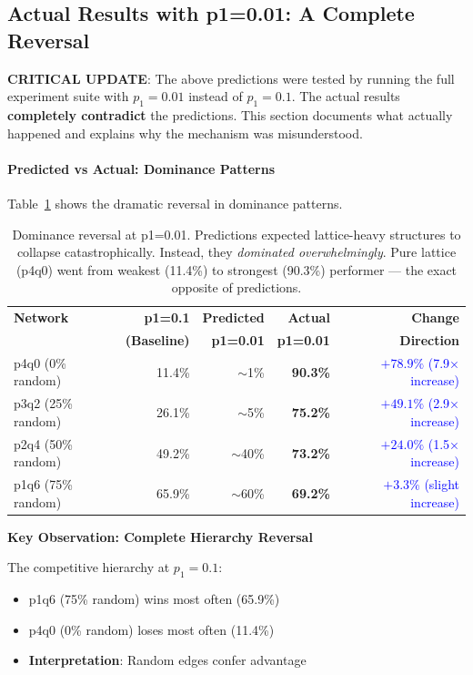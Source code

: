 \documentclass[12pt,a4paper]{article}
\begin{document}
\subsection{Actual Results with p1=0.01: A Complete Reversal}

\textbf{CRITICAL UPDATE}: The above predictions were tested by running the full experiment suite with $p_1 = 0.01$ instead of $p_1 = 0.1$. The actual results \textbf{completely contradict} the predictions. This section documents what actually happened and explains why the mechanism was misunderstood.

\paragraph{Predicted vs Actual: Dominance Patterns}

Table~\ref{tab:p1_comparison_dominance} shows the dramatic reversal in dominance patterns.

\begin{table}[H]
\centering
\begin{tabular}{@{}lrrrr@{}}
\toprule
\textbf{Network} & \textbf{p1=0.1} & \textbf{Predicted} & \textbf{Actual} & \textbf{Change} \\
 & \textbf{(Baseline)} & \textbf{p1=0.01} & \textbf{p1=0.01} & \textbf{Direction} \\
\midrule
p4q0 (0\% random)  & 11.4\% & $\sim$1\% & \textbf{90.3\%} & \textcolor{blue}{$+78.9\%$ (7.9× increase)} \\
p3q2 (25\% random) & 26.1\% & $\sim$5\% & \textbf{75.2\%} & \textcolor{blue}{$+49.1\%$ (2.9× increase)} \\
p2q4 (50\% random) & 49.2\% & $\sim$40\% & \textbf{73.2\%} & \textcolor{blue}{$+24.0\%$ (1.5× increase)} \\
p1q6 (75\% random) & 65.9\% & $\sim$60\% & \textbf{69.2\%} & \textcolor{blue}{$+3.3\%$ (slight increase)} \\
\bottomrule
\end{tabular}
\caption{Dominance reversal at p1=0.01. Predictions expected lattice-heavy structures to collapse catastrophically. Instead, they \textit{dominated overwhelmingly}. Pure lattice (p4q0) went from weakest (11.4\%) to strongest (90.3\%) performer --- the exact opposite of predictions.}
\label{tab:p1_comparison_dominance}
\end{table}

\textbf{Key Observation: Complete Hierarchy Reversal}

The competitive hierarchy at $p_1=0.1$:
\begin{itemize}
    \item p1q6 (75\% random) wins most often (65.9\%)
    \item p4q0 (0\% random) loses most often (11.4\%)
    \item \textbf{Interpretation}: Random edges confer advantage
\end{itemize}
\end{document}
